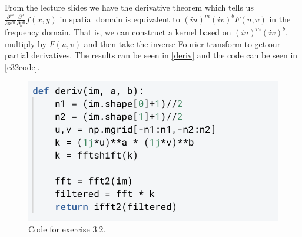 From the lecture slides we have the derivative theorem which tells us $\frac{\partial^m}{\partial x^m}\frac{\partial^n}{\partial y^n}f(x,y)$ in spatial domain is equivalent to $(iu)^m(iv)^bF(u,v)$ in the frequency domain. That is, we can construct a kernel based on $(iu)^m(iv)^b$, multiply by $F(u,v)$ and then take the inverse Fourier transform to get our partial derivatives. The results can be seen in \autoref{deriv} and the code can be seen in \autoref{e32code}.
\begin{figure}[H]
	\centering
	\includegraphics[width=0.7\linewidth]{Materials/e32code}
	\caption{Code for exercise 3.2.}
	\label{e32code}
\end{figure}